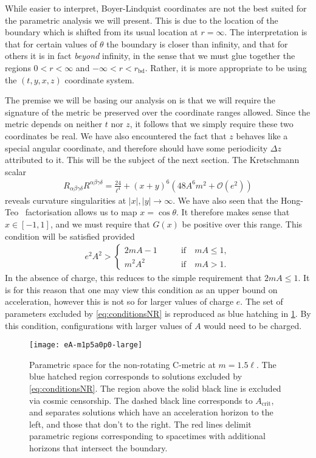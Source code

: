 \documentclass[
twoside,
openright,
frontopenright
]{dmathesis}
\begin{document}
While easier to interpret, Boyer-Lindquist coordinates are not the best suited
for the parametric analysis we will present. This is due to the location of the
boundary which is shifted from its usual location at $r=\infty$. The
interpretation is that for certain values of $\theta$ the boundary is closer
than infinity, and that for others it is in fact \emph{beyond} infinity, in the
sense that we must glue together the regions $0<r<\infty$ and
$-\infty < r < r_\mathrm{bd}$. Rather, it is more appropriate to be using the
$(t,y,x,z)$ coordinate system.

The premise we will be basing our analysis on is that we will require the
signature of the metric be preserved over the coordinate ranges allowed. Since
the metric depends on neither $t$ nor $z$, it follows that we simply require
these two coordinates be real. We have also encountered the fact that $z$
behaves like a special angular coordinate, and therefore should have some
periodicity $\Delta z$ attributed to it. This will be the subject of the next
section. The Kretschmann scalar
\begin{align}
  R_{\alpha\beta\gamma\delta}R^{\alpha\beta\gamma\delta} = \frac{24}{\ell^4} +
  (x+y)^6\left(48A^6m^2+\mathcal{O}(e^2)\right)
\end{align}
reveals curvature singularities at $|x|,|y|\to\infty$. We have also seen that
the Hong-Teo~\cite{Hong:2003gx} factorisation allows us to map
$x=\cos\theta$. It therefore makes sense that $x \in [-1,1]$, and we must
require that $G(x)$ be positive over this range. This condition will be
satisfied provided
\begin{align}
  \label{eq:conditionsNR}
  e^2A^2 >
  \begin{cases}
    2mA - 1 \qquad &\mbox{if} \quad mA \leqslant 1,\\
    m^2A^2 \qquad &\mbox{if} \quad mA > 1.
  \end{cases}
\end{align}
In the absence of charge, this reduces to the simple requirement that
$2mA\leqslant 1$. It is for this reason that one may view this condition as an
upper bound on acceleration, however this is not so for larger values of charge
$e$. The set of parameters excluded by \cref{eq:conditionsNR} is reproduced as
blue hatching in \cref{fig:param-regionsNR}. By this condition, configurations
with larger values of $A$ would need to be charged.

\begin{figure}
  \centering
  \texttt{[image: eA-m1p5a0p0-large]}
  \caption{\label{fig:param-regionsNR}Parametric space for the non-rotating C-metric
    at $m=1.5\ell$. The blue hatched region corresponds to solutions excluded by
    \cref{eq:conditionsNR}. The region above the solid black line is excluded
    via cosmic censorship. The dashed black line corresponds to
    $A_\mathrm{crit}$, and separates solutions which have an acceleration
    horizon to the left, and those that don't to the right. The red lines
    delimit parametric regions corresponding to spacetimes with additional
    horizons that intersect the boundary.}
\end{figure}
\end{document}

